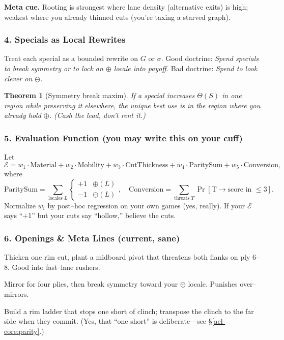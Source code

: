 \documentclass[11pt]{article}
\numberwithin{equation}{section} %
\theoremstyle{plain} %
\newtheorem{theorem}{Theorem}[section]
\theoremstyle{definition} %
\theoremstyle{remark} %
\begin{document}
\noindent\textbf{Meta cue.} Rooting is strongest where lane density (alternative exits) is high; weakest where you already thinned cuts (you’re taxing a starved graph).

\subsubsection{4. Specials as Local Rewrites}
\label{ael-core:specials}
Treat each special as a bounded rewrite on \(G\) or \(\sigma\). Good doctrine: \emph{Spend specials to break symmetry or to lock an \(\oplus\) locale into payoff.} Bad doctrine: \emph{Spend to look clever on \(\ominus\).} 

\begin{theorem}[Symmetry break maxim]
If a special increases \(\Theta(S)\) in one region while preserving it elsewhere, the unique best use is in the region where you already hold \(\oplus\). (Cash the lead, don’t rent it.)
\end{theorem}

\subsubsection{5. Evaluation Function (you may write this on your cuff)}
Let 
\[
\mathcal{E} = w_1 \cdot \text{Material} + w_2 \cdot \text{Mobility} + w_3 \cdot \text{CutThickness} + w_4 \cdot \text{ParitySum} + w_5 \cdot \text{Conversion},
\]
where
\[
\text{ParitySum}=\sum_{\text{locales }L} \begin{cases}+1 & \oplus(L)\\ -1 & \ominus(L)\end{cases}, \quad
\text{Conversion}=\sum_{\text{threats }T}\Pr[\text{T}\to\text{score in }\le 3].
\]
Normalize \(w_i\) by post–hoc regression on your own games (yes, really). If your \(\mathcal{E}\) says “+1” but your cuts say “hollow,” believe the cuts.

\subsubsection{6. Openings \& Meta Lines (current, sane)}
\begin{description}\setlength\itemsep{0.35em}
  \item[\textit{Cage \& Pivot.}] Thicken one rim cut, plant a midboard pivot that threatens both flanks on ply 6–8. Good into fast–lane rushers.
  \item[\textit{Mirror–Then–Shiver.}] Mirror for four plies, then break symmetry toward your \(\oplus\) locale. Punishes over–mirrors.
  \item[\textit{Ladder–to–Ladder.}] Build a rim ladder that stops one short of clinch; transpose the clinch to the far side when they commit. (Yes, that “one short” is deliberate—see \S\ref{ael-core:parity}.)
\end{description}
\end{document}
